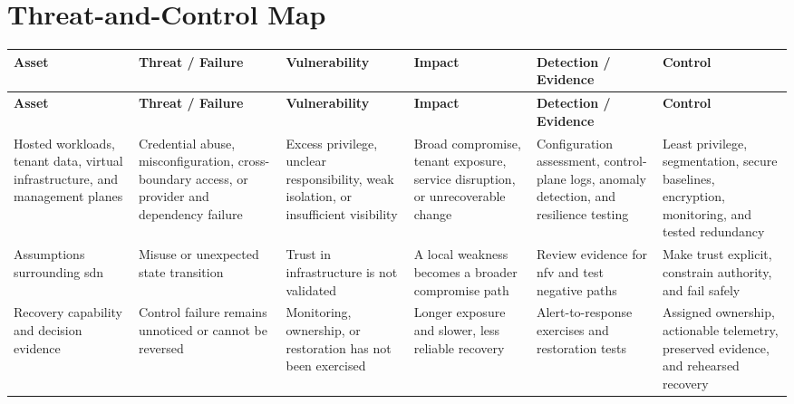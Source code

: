 \documentclass[11pt]{article}
\begin{document}
\section*{Threat-and-Control Map}
\begingroup\scriptsize\setlength{\tabcolsep}{2pt}
\begin{longtable}{>{\RaggedRight\arraybackslash}p{}>{\RaggedRight\arraybackslash}p{}>{\RaggedRight\arraybackslash}p{}>{\RaggedRight\arraybackslash}p{}>{\RaggedRight\arraybackslash}p{}>{\RaggedRight\arraybackslash}p{}}
\toprule\rowcolor{Navy}\color{white}\textbf{Asset} & \color{white}\textbf{Threat / Failure} & \color{white}\textbf{Vulnerability} & \color{white}\textbf{Impact} & \color{white}\textbf{Detection / Evidence} & \color{white}\textbf{Control}\\\midrule
\endfirsthead
\toprule\rowcolor{Navy}\color{white}\textbf{Asset} & \color{white}\textbf{Threat / Failure} & \color{white}\textbf{Vulnerability} & \color{white}\textbf{Impact} & \color{white}\textbf{Detection / Evidence} & \color{white}\textbf{Control}\\\midrule
\endhead
Hosted workloads, tenant data, virtual infrastructure, and management planes & Credential abuse, misconfiguration, cross-boundary access, or provider and dependency failure & Excess privilege, unclear responsibility, weak isolation, or insufficient visibility & Broad compromise, tenant exposure, service disruption, or unrecoverable change & Configuration assessment, control-plane logs, anomaly detection, and resilience testing & Least privilege, segmentation, secure baselines, encryption, monitoring, and tested redundancy\\\midrule
Assumptions surrounding sdn & Misuse or unexpected state transition & Trust in infrastructure is not validated & A local weakness becomes a broader compromise path & Review evidence for nfv and test negative paths & Make trust explicit, constrain authority, and fail safely\\\midrule
Recovery capability and decision evidence & Control failure remains unnoticed or cannot be reversed & Monitoring, ownership, or restoration has not been exercised & Longer exposure and slower, less reliable recovery & Alert-to-response exercises and restoration tests & Assigned ownership, actionable telemetry, preserved evidence, and rehearsed recovery\\\midrule
\bottomrule
\end{longtable}
\endgroup
\end{document}
